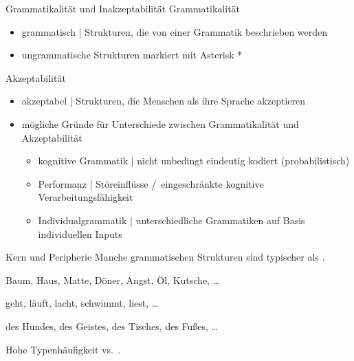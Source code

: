 \begin{frame}
  {Grammatikalität und Inakzeptabilität}
  \onslide<+->
  \onslide<+->
  \alert{Grammatikalität}\\
  \Halbzeile
  \begin{itemize}[<+->]
    \item grammatisch | Strukturen, die von einer Grammatik beschrieben werden
    \item ungrammatische Strukturen markiert mit Asterisk *
  \end{itemize}
  \Zeile
  \alert{Akzeptabilität}
  \Halbzeile
  \begin{itemize}[<+->]
    \item akzeptabel | Strukturen, die Menschen als ihre Sprache akzeptieren
    \item mögliche Gründe für Unterschiede zwischen Grammatikalität und Akzeptabilität
      \begin{itemize}[<+->]
          \Halbzeile
        \item kognitive Grammatik | nicht unbedingt eindeutig kodiert (probabilistisch)
        \item Performanz | Störeinflüsse \slash\ eingeschränkte kognitive Verarbeitungsfähigkeit
        \item Individualgrammatik | unterschiedliche Grammatiken auf Basis individuellen Inputs
      \end{itemize}
  \end{itemize}
\end{frame}

\begin{frame}
  {Kern und Peripherie}
  \onslide<+->
  \onslide<+->
  Manche grammatischen Strukturen sind \alert{typischer} als .\\
  \Zeile
  \onslide<+->
  \begin{exe}
    \ex\label{ex:kernundperipherie022}
      \begin{xlist}
        \ex \alert{Baum, Haus, Matte, Döner, Angst, Öl, Kutsche, \ldots}
        \ex {}
      \end{xlist}
      \onslide<+->
      \ex
      \begin{xlist}
        \ex \alert{geht, läuft, lacht, schwimmt, liest, \ldots}
        \ex {}
      \end{xlist}
      \onslide<+->
      \ex
      \begin{xlist}
        \ex \alert{des Hundes, des Geistes, des Tisches, des Fußes, \ldots}
        \ex {}
      \end{xlist}
  \end{exe}
  \onslide<+->
  \Zeile
  \Large
  \centering
  \alert{Hohe Typenhäufigkeit} vs.\ .  
\end{frame}


